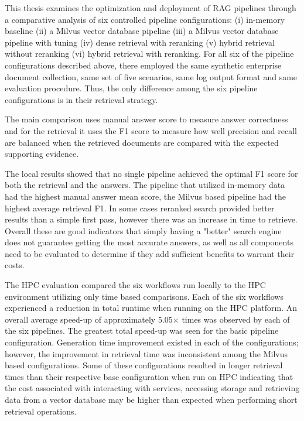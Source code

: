 This thesis examines the optimization and deployment of \ac{RAG} pipelines through a comparative analysis of six controlled pipeline configurations: (i) in-memory baseline (ii) a Milvus vector database pipeline (iii) a Milvus vector database pipeline with tuning (iv) dense retrieval with reranking (v) hybrid retrieval without reranking (vi) hybrid retrieval with reranking. For all six of the pipeline configurations described above, there employed the same synthetic enterprise document collection, same set of five scenarios, same log output format and same evaluation procedure. Thus, the only difference among the six pipeline configurations is in their retrieval strategy.

The main comparison uses manual answer score to measure answer correctness and for the retrieval it uses the F1 score to measure how well precision and recall are balanced when the retrieved documents are compared with the expected supporting evidence.

The local results showed that no single pipeline achieved the optimal F1 score for both the retrieval and the answers. The pipeline that utilized in-memory data had the highest manual answer mean score, the Milvus based pipeline had the highest average retrieval F1. In some cases reranked search provided better results than a simple first pass, however there was an increase in time to retrieve. Overall these are good indicators that simply having a "better" search engine does not guarantee getting the most accurate answers, as well as all components need to be evaluated to determine if they add sufficient benefits to warrant their costs.

The \acf{HPC} evaluation compared the six workflows run locally to the \ac{HPC} environment utilizing only time based comparisons. Each of the six workflows experienced a reduction in total runtime when running on the \ac{HPC} platform. An overall average speed-up of approximately 5.05$\times$ times was observed by each of the six pipelines. The greatest total speed-up was seen for the basic pipeline configuration. Generation time improvement existed in each of the configurations; however, the improvement in retrieval time was inconsistent among the Milvus based configurations. Some of these configurations resulted in longer retrieval times than their respective base configuration when run on \ac{HPC} indicating that the cost associated with interacting with services, accessing storage and retrieving data from a vector database may be higher than expected when performing short retrieval operations.

